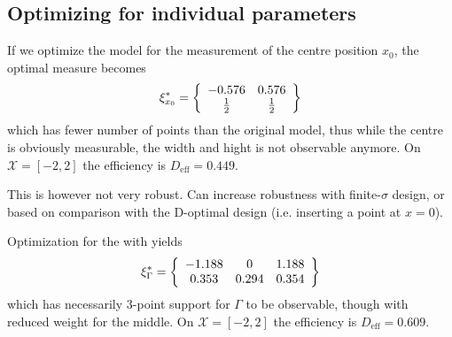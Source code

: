 \documentclass[12pt]{iopart}
\begin{document}
\subsection{Optimizing for individual parameters}

If we optimize the model  for the measurement of the centre position $x_0$, the optimal measure becomes
\begin{equation}
\xi^*_{x_0} = \left\{
  \begin{array}{c c}
    -0.576 & 0.576 \\
    \frac{1}{2} & \frac{1}{2}\\
  \end{array} \right \}
\end{equation}
which has fewer number of points than the original model, thus while the centre is obviously measurable, the width and hight is not observable anymore.  On $\mathcal{X} = [-2,2]$ the efficiency is $D_\mathrm{eff} = 0.449$.

This is however not very robust. Can increase robustness with finite-$\sigma$ design, or based on comparison with the D-optimal design (i.e. inserting a point at $x=0$).


Optimization for the with yields
\begin{equation}
\xi^*_{\Gamma} = \left\{
  \begin{array}{c c c}
    -1.188 & 0 &  1.188 \\
    0.353 & 0.294 & 0.354\\
  \end{array} \right \}
\end{equation}
which has necessarily 3-point support for $\Gamma$ to be observable, though with reduced weight for the middle. On $\mathcal{X} = [-2,2]$ the efficiency is $D_\mathrm{eff} = 0.609$.
\end{document}
